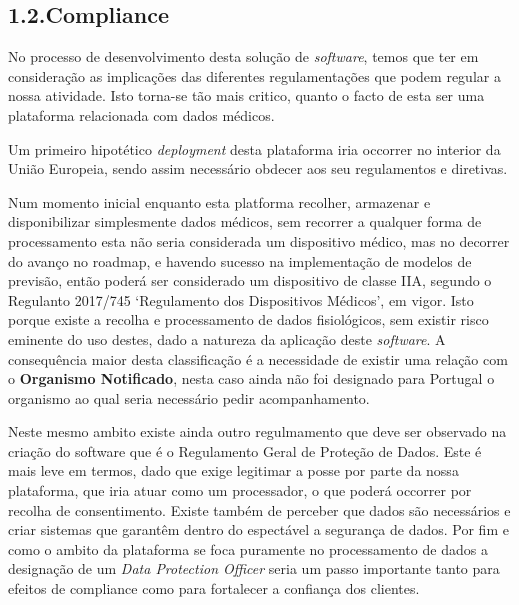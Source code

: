 \documentclass{article}
\begin{document}
\subsection{1.2.\hspace*{0.5em}Compliance}\label{sec-compliance}%

\noindent{}No processo de desenvolvimento desta solução de \emph{software}, temos que ter em consideração as implicações das diferentes regulamentações que podem regular a nossa atividade. Isto torna-se tão mais critico, quanto o facto de esta ser uma plataforma relacionada com dados médicos.%

Um primeiro hipotético \emph{deployment} desta plataforma iria occorrer no interior da União Europeia, sendo assim necessário obdecer aos seu regulamentos e diretivas.%

Num momento inicial enquanto esta platforma recolher, armazenar e disponibilizar simplesmente dados médicos, sem recorrer a qualquer forma de processamento esta não seria considerada um dispositivo médico, mas no decorrer do avanço no roadmap, e havendo sucesso na implementação de modelos de previsão, então poderá ser considerado um dispositivo de classe IIA, segundo o Regulanto 2017/745 \textquoteleft{}Regulamento dos Dispositivos Médicos\textquoteright{}, em vigor. Isto porque existe a recolha e processamento de dados fisiológicos, sem existir risco eminente do uso destes, dado a natureza da aplicação deste \emph{software}. A consequência maior desta classificação é a necessidade de existir uma relação com o \textbf{Organismo Notificado}, nesta caso ainda não foi designado para Portugal o organismo ao qual seria necessário pedir acompanhamento.%

Neste mesmo ambito existe ainda outro regulmamento que deve ser observado na criação do software que é o Regulamento Geral de Proteção de Dados. Este é mais leve em termos, dado que exige legitimar a posse por parte da nossa plataforma, que iria atuar como um processador, o que poderá occorrer por recolha de consentimento. Existe também de perceber que dados são necessários e criar sistemas que garantêm dentro do espectável a segurança de dados. Por fim e como o ambito da plataforma se foca puramente no processamento de dados a designação de um \emph{Data Protection Officer} seria um passo importante tanto para efeitos de compliance como para fortalecer a confiança dos clientes.%
\end{document}
